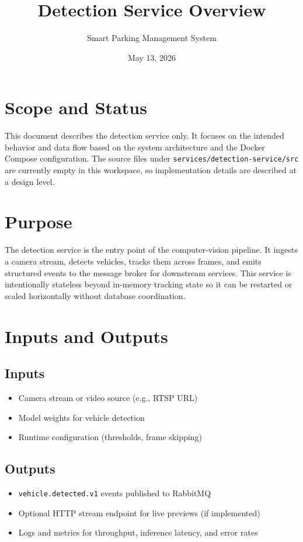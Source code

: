 \documentclass[11pt]{article}
\title{Detection Service Overview}
\author{Smart Parking Management System}
\date{May 13, 2026}
\begin{document}
\maketitle

\section{Scope and Status}
This document describes the detection service only. It focuses on the intended behavior and data flow based on the system architecture and the Docker Compose configuration. The source files under \texttt{services/detection-service/src} are currently empty in this workspace, so implementation details are described at a design level.

\section{Purpose}
The detection service is the entry point of the computer-vision pipeline. It ingests a camera stream, detects vehicles, tracks them across frames, and emits structured events to the message broker for downstream services. This service is intentionally stateless beyond in-memory tracking state so it can be restarted or scaled horizontally without database coordination.

\section{Inputs and Outputs}
\subsection*{Inputs}
\begin{itemize}
  \item Camera stream or video source (e.g., RTSP URL)
  \item Model weights for vehicle detection
  \item Runtime configuration (thresholds, frame skipping)
\end{itemize}

\subsection*{Outputs}
\begin{itemize}
  \item \texttt{vehicle.detected.v1} events published to RabbitMQ
  \item Optional HTTP stream endpoint for live previews (if implemented)
  \item Logs and metrics for throughput, inference latency, and error rates
\end{itemize}
\end{document}
